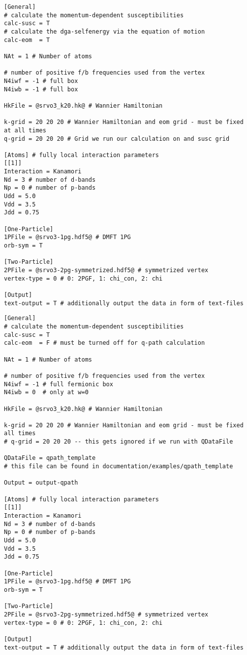 \documentclass[a4paper,11pt]{article}
\numberwithin{equation}{section} %
\begin{document}
\newpage
\begin{lstlisting}[caption=config file for q-grid calculation, frame=single, basicstyle=\small, style=base2, label={lst:configqgrid}]
[General]
# calculate the momentum-dependent susceptibilities
calc-susc = T
# calculate the dga-selfenergy via the equation of motion
calc-eom  = T

NAt = 1 # Number of atoms

# number of positive f/b frequencies used from the vertex
N4iwf = -1 # full box
N4iwb = -1 # full box

HkFile = @srvo3_k20.hk@ # Wannier Hamiltonian

k-grid = 20 20 20 # Wannier Hamiltonian and eom grid - must be fixed at all times
q-grid = 20 20 20 # Grid we run our calculation on and susc grid

[Atoms] # fully local interaction parameters
[[1]]
Interaction = Kanamori
Nd = 3 # number of d-bands
Np = 0 # number of p-bands
Udd = 5.0
Vdd = 3.5
Jdd = 0.75

[One-Particle]
1PFile = @srvo3-1pg.hdf5@ # DMFT 1PG
orb-sym = T

[Two-Particle]
2PFile = @srvo3-2pg-symmetrized.hdf5@ # symmetrized vertex
vertex-type = 0 # 0: 2PGF, 1: chi_con, 2: chi

[Output]
text-output = T # additionally output the data in form of text-files
\end{lstlisting}

\newpage
\begin{lstlisting}[caption=config file for q-path calculation, frame=single, basicstyle=\small, style=base2,label={lst:configqpath}]
[General]
# calculate the momentum-dependent susceptibilities
calc-susc = T
calc-eom  = F # must be turned off for q-path calculation

NAt = 1 # Number of atoms

# number of positive f/b frequencies used from the vertex
N4iwf = -1 # full fermionic box
N4iwb = 0  # only at w=0

HkFile = @srvo3_k20.hk@ # Wannier Hamiltonian

k-grid = 20 20 20 # Wannier Hamiltonian and eom grid - must be fixed all times
# q-grid = 20 20 20 -- this gets ignored if we run with QDataFile

QDataFile = qpath_template
# this file can be found in documentation/examples/qpath_template

Output = output-qpath

[Atoms] # fully local interaction parameters
[[1]]
Interaction = Kanamori
Nd = 3 # number of d-bands
Np = 0 # number of p-bands
Udd = 5.0
Vdd = 3.5
Jdd = 0.75

[One-Particle]
1PFile = @srvo3-1pg.hdf5@ # DMFT 1PG
orb-sym = T

[Two-Particle]
2PFile = @srvo3-2pg-symmetrized.hdf5@ # symmetrized vertex
vertex-type = 0 # 0: 2PGF, 1: chi_con, 2: chi

[Output]
text-output = T # additionally output the data in form of text-files
\end{lstlisting}
\newpage
\end{document}
